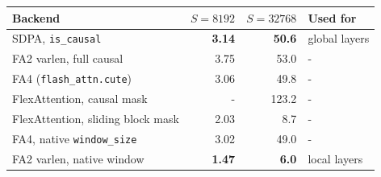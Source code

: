 \begin{tabular}{lrrl}
\toprule
Backend & $S{=}8192$ & $S{=}32768$ & Used for \\
\midrule
SDPA, \texttt{is\_causal} & \textbf{3.14} & \textbf{50.6} & global layers \\
FA2 varlen, full causal & 3.75 & 53.0 & - \\
FA4 (\texttt{flash\_attn.cute}) & 3.06 & 49.8 & - \\
FlexAttention, causal mask & - & 123.2 & - \\
\midrule
FlexAttention, sliding block mask & 2.03 & 8.7 & - \\
FA4, native \texttt{window\_size} & 3.02 & 49.0 & - \\
FA2 varlen, native window & \textbf{1.47} & \textbf{6.0} & local layers \\
\bottomrule
\end{tabular}
